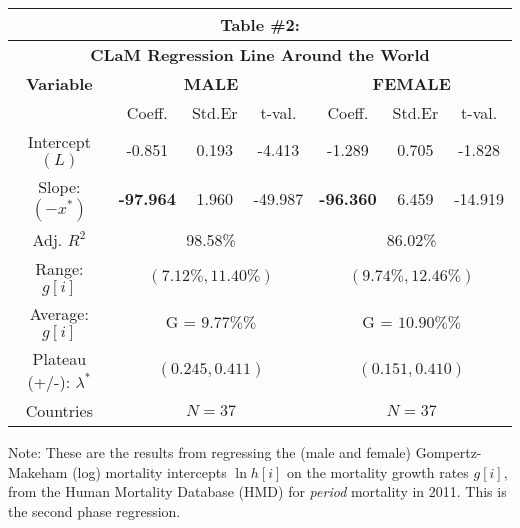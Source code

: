 \documentclass[12pt, titlepage]{article}%
\begin{document}
\clearpage
\begin{table}
\begin{center}
\begin{tabular}{||c||c|c|c|c|c|c||}\hline\hline
\multicolumn{7}{||c||}{Table \#2:} \\ \hline
\multicolumn{7}{||c||}{{\bf CLaM Regression Line Around the World}} \\ \hline
{\bf Variable} & \multicolumn{3}{|c|}{{\bf MALE}} & \multicolumn{3}{|c||}{{\bf FEMALE}} \\ \hline
& Coeff. & Std.Er & t-val. & Coeff. & Std.Er & t-val.  \\ \hline
Intercept $(L)$ & -0.851 & 0.193 & -4.413 & -1.289 & 0.705 & -1.828 \\ \hline
Slope: $(-x^{*})$ & {\bf-97.964} & 1.960 & -49.987 & {\bf-96.360} & 6.459 & -14.919 \\ \hline
Adj. $R^2$ & \multicolumn{3}{|c|}{98.58\%} & \multicolumn{3}{|c||}{86.02\%} \\ \hline
Range: $g[i]$ & \multicolumn{3}{|c|}{$(7.12\%, 11.40\%)$} & \multicolumn{3}{|c||}{$(9.74\%, 12.46\%)$} \\ \hline
Average: $g[i]$ & \multicolumn{3}{|c|}{G \; = \; $9.77\%\%$} & \multicolumn{3}{|c||}{G \; = \; $10.90\%\%$} \\ \hline
Plateau (+/-): $\lambda^{*}$ & \multicolumn{3}{|c|}{$ (0.245, 0.411)$} & \multicolumn{3}{|c||}{$ (0.151, 0.410)$} \\ \hline
Countries & \multicolumn{3}{|c|}{$N=37$} & \multicolumn{3}{|c||}{$N=37$} \\ \hline
\end{tabular}\label{tab3}\end{center}Note: These are the results from regressing the (male and female) Gompertz-Makeham (log) mortality intercepts $\ln h[i]$ on the mortality growth rates $g[i]$, from the Human Mortality Database (HMD) for {\em period} mortality in 2011. This is the second phase regression.
\end{table}
\end{document}

